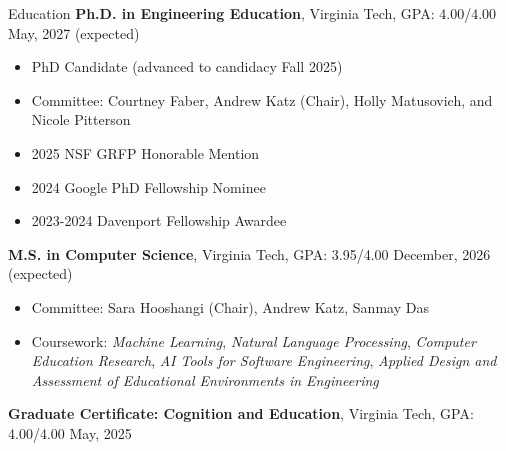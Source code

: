 \documentclass{resume}
\newcommand{\smallspace}{\hspace{0.2em}}
\begin{document}
\begin{rSection}{Education}
{\textbf {Ph.D. in Engineering Education}}, Virginia Tech, GPA: 4.00/4.00 \hfill {May, 2027 (expected)} 
\begin{itemize}
    \item[] \vspace{-0.5em} \hspace{-1em} PhD Candidate (advanced to candidacy Fall 2025)
    \item[] \vspace{-0.5em} \hspace{-1em} Committee: Courtney Faber, Andrew Katz (Chair), Holly Matusovich, and Nicole Pitterson
    \item[] \vspace{-0.5em} \hspace{-1em} 2025 NSF GRFP Honorable Mention
    \item[] \vspace{-0.5em} \hspace{-1em} 2024 Google PhD Fellowship Nominee
    \item[] \vspace{-0.5em} \hspace{-1em} 2023-2024 Davenport Fellowship Awardee
\end{itemize}

{\textbf {M.S. in Computer Science}}, Virginia Tech, GPA: 3.95/4.00 \hfill {December, 2026 (expected)} 
\begin{itemize}
    \item[] \vspace{-0.5em} \hspace{-1em} Committee: Sara Hooshangi (Chair), Andrew Katz, Sanmay Das
  \item[] \vspace{-0.5em} \hspace{-1.0em} Coursework: \emph{Machine Learning}, \smallspace \emph{Natural Language Processing}, \smallspace \emph{Computer Education Research}, \smallspace \emph{AI Tools for Software Engineering}, \smallspace \emph{Applied Design and Assessment of Educational Environments in Engineering}
\end{itemize}

{\textbf {Graduate Certificate: Cognition and Education}}, Virginia Tech, GPA: 4.00/4.00 \hfill {May, 2025} 


\end{rSection}
\end{document}
